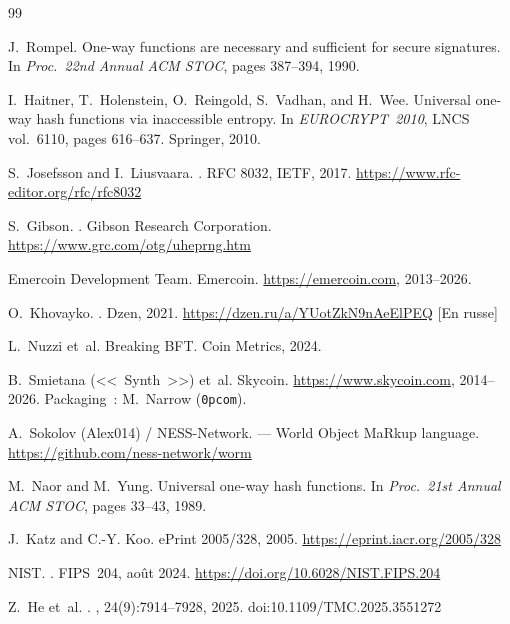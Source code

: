 \documentclass[11pt,a4paper]{article}
\theoremstyle{definition}
\begin{document}

\begin{thebibliography}{99}

J.~Rompel.
\newblock One-way functions are necessary and sufficient for secure
  signatures.
\newblock In {\em Proc.\ 22nd Annual ACM STOC}, pages 387--394, 1990.

I.~Haitner, T.~Holenstein, O.~Reingold, S.~Vadhan, and H.~Wee.
\newblock Universal one-way hash functions via inaccessible entropy.
\newblock In {\em EUROCRYPT~2010}, LNCS vol.~6110, pages 616--637.
  Springer, 2010.

S.~Josefsson and I.~Liusvaara.
. RFC 8032, IETF, 2017.
\newblock \url{https://www.rfc-editor.org/rfc/rfc8032}

S.~Gibson.
. Gibson Research Corporation.
\newblock \url{https://www.grc.com/otg/uheprng.htm}

Emercoin Development Team.
\newblock Emercoin. \url{https://emercoin.com}, 2013--2026.

O.~Khovayko.
.
\newblock Dzen, 2021.
\newblock \url{https://dzen.ru/a/YUotZkN9nAeElPEQ} [En russe]

L.~Nuzzi et~al.
\newblock Breaking {BFT}. Coin Metrics, 2024.

B.~Smietana (<<~Synth~>>) et~al.
\newblock Skycoin. \url{https://www.skycoin.com}, 2014--2026.
\newblock Packaging~: M.~Narrow (\texttt{0pcom}).

A.~Sokolov (Alex014) / {NESS-Network}.
 --- {W}orld {O}bject {Ma}R\-kup language.
\newblock \url{https://github.com/ness-network/worm}

M.~Naor and M.~Yung.
\newblock Universal one-way hash functions.
\newblock In {\em Proc.\ 21st Annual ACM STOC}, pages 33--43, 1989.

J.~Katz and C.-Y. Koo.
\newblock ePrint 2005/328, 2005.
\newblock \url{https://eprint.iacr.org/2005/328}

{NIST}.
. {FIPS}~204, août 2024.
\newblock \url{https://doi.org/10.6028/NIST.FIPS.204}

Z.~He et~al.
.
, 24(9):7914--7928, 2025.
\newblock doi:10.1109/TMC.2025.3551272


\end{thebibliography}
\end{document}
